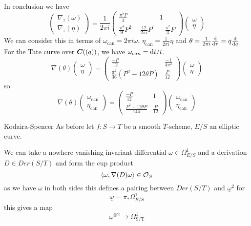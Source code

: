 \begin{frame}
    In conclusion we have
    \[
        \left(\begin{array}{c}
\nabla_\tau(\omega) \\
\nabla_{\tau}(\eta)
\end{array}\right)=\frac{1}{2 \pi i}\left(\begin{array}{cc}
\frac{\pi^{2} P}{3} & 1 \\
\frac{\pi^{4}}{9} P^{2}-\frac{12}{2 \pi i} P^{\prime} & -\frac{\pi^{2}}{3} P
\end{array}\right)\left(\begin{array}{l}
\omega \\
\eta
\end{array}\right)
\]
We can consider this in terms of $\omega_{\mathrm{can}}=2 \pi i \omega,\, \eta_{\mathrm{can}}=\frac{1}{2 \pi i} \eta$ and $\theta=\frac{1}{2 \pi i} \frac{\mathop{}\!\mathrm{d}}{\mathop{}\!\mathrm{d} \tau}=q \frac{\mathop{}\!\mathrm{d}}{\mathop{}\!\mathrm{d} q}$
For the Tate curve over $\bm C((q))$, we have $\omega_{can} = \mathop{}\!\mathrm{d} t / t$.
\[
\nabla(\theta)\left(\begin{array}{c}
\omega \\
\eta
\end{array}\right)=\left(\begin{array}{cc}
\frac{-P}{12} & \frac{-1}{4 \pi^{2}} \\
\frac{\pi^{2}}{36}\left(P ^{2}-12 \theta P \right) & \frac{P }{12}
\end{array}\right)\left(\begin{array}{c}
\omega \\
\eta
\end{array}\right)
\]
so
\[
    \nabla(\theta)\left(\begin{array}{c}
\omega_{\mathrm{can}} \\
\eta_{\mathrm{can}}
\end{array}\right)=\left(\begin{array}{cc}
\frac{-P}{12} & 1 \\
\frac{P^{2}-12 \theta {P}}{144} & \frac{{P}}{12}
\end{array}\right)\left(\begin{array}{l}
\omega_{\mathrm{can}} \\
\eta_{\mathrm{can}}
\end{array}\right)
\]
\end{frame}

\begin{frame}{Kodaira-Spencer}
    As before let $f\colon S \rightarrow T$ be a smooth $T$-scheme, $E/S$ an elliptic curve.

    We can take a nowhere vanishing invariant differential $\omega \in \Omega_{E/S}^1$ and a derivation $D\in Der(S/T)$ and form the cup product
    \[ \left\langle \omega, \nabla(D) \omega \right\rangle \in \operatorname{\mathcal{O}}_S\]
    as we have $\omega$ in both sides this defines a pairing between $Der(S/T)$ and $\underline \omega^2$ for
    \[\underline \omega = \pi_{*} \Omega_{E / S}^{1} \]
    this gives a map
    \[
        \underline{\omega}^{\otimes 2}\to \Omega_{\mathrm{S} / \mathrm{T}}^{1}
    \]
\end{frame}

